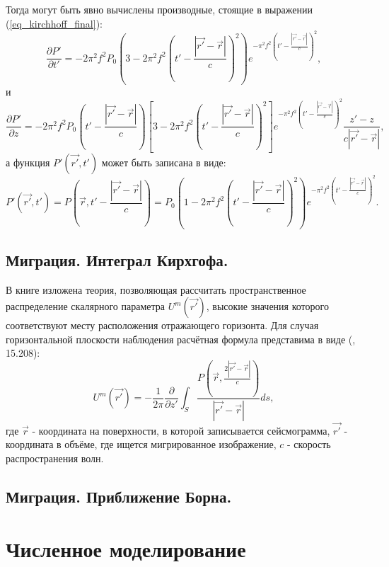 \documentclass{article}
\begin{document}
Тогда могут быть явно вычислены производные, стоящие в выражении (\ref{eq_kirchhoff_final}):
\begin{equation}
\label{eq_dp'_dt'}
\frac{\partial P'}{\partial t'} = -2\pi^2f^2P_0(3-2 \pi^2f^2(t' - \frac{|\vec{r'} - \vec{r}|}{c})^2)e^{-\pi^2f^2(t' - \frac{|\vec{r'} - \vec{r}|}{c})^2},
\end{equation}
и
\begin{equation}
\label{eq_dp'_dz}
\frac{\partial P'}{\partial z} = -2\pi^2f^2P_0(t' - \frac{|\vec{r'} - \vec{r}|}{c})[3-2 \pi^2f^2(t' - \frac{|\vec{r'} - \vec{r}|}{c})^2]e^{-\pi^2f^2(t' - \frac{|\vec{r'} - \vec{r}|}{c})^2}
\frac{z'-z}{c|\vec{r'}-\vec{r}|},
\end{equation}
а функция $P'(\vec{r'}, t')$ может быть записана в виде:
\begin{equation}
\label{eq_surface_pressure}
P'(\vec{r'}, t') = P(\vec{r}, t' - \frac{|\vec{r'} - \vec{r}|}{c}) = P_0(1-2 \pi^2f^2(t' - \frac{|\vec{r'} - \vec{r}|}{c})^2)e^{-\pi^2f^2(t'-\frac{|\vec{r'} - \vec{r}|}{c})^2}.
\end{equation}

\subsection{Миграция. Интеграл Кирхгофа.}

В книге \cite{Zhdanov_2007} изложена теория, позволяющая рассчитать пространственное распределение скалярного параметра $U^m(\vec{r'})$, высокие значения которого соответствуют
месту расположения отражающего горизонта.
Для случая горизонтальной плоскости наблюдения расчётная формула представима в виде (\cite{Zhdanov_2007}, 15.208):
\begin{equation}
\label{rayleigh_migration}
U^m(\vec{r'}) = -\frac{1}{2\pi}\frac{\partial}{\partial z'}
	\int_S \frac{P(\vec{r},\frac{2|\vec{r'}-\vec{r}|}{c})}{|\vec{r'}-\vec{r}|}ds,
\end{equation}
где $\vec{r}$ - координата на поверхности, в которой записывается сейсмограмма, $\vec{r'}$ - координата в объёме, где ищется мигрированное изображение, $c$ - скорость распространения волн.

\subsection{Миграция. Приближение Борна.}


\section{Численное моделирование}
\end{document}
